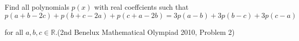Find all polynomials $p(x)$ with real coeffcients such that\[p(a + b - 2c) + p(b + c - 2a) + p(c + a - 2b) = 3p(a - b) + 3p(b - c) + 3p(c - a)\]

for all $a, b, c\in\mathbb{R}$.(2nd Benelux Mathematical Olympiad 2010, Problem 2)
